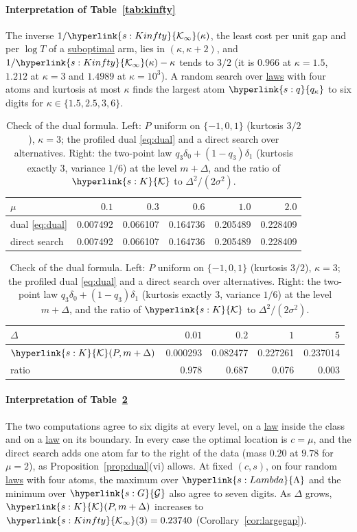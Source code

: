 \documentclass[11pt]{article}
\newcommand{\sy}[2]{{\hyperlink{#1}{#2}}}
\newcommand{\term}[2]{\hyperlink{#1}{#2}}
\newcommand{\Kc}{\sy{s:K}{\mathcal{K}}}
\newcommand{\Gk}{\sy{s:G}{\mathcal{G}}}
\newcommand{\Lam}{\sy{s:Lambda}{\Lambda}}
\newcommand{\qk}{\sy{s:q}{q_{\kappa}}}
\newcommand{\Kinfty}{\sy{s:Kinfty}{\mathcal{K}_{\infty}}}
\begin{document}
\paragraph{Interpretation of Table~\ref{tab:kinfty}} The inverse $1/\Kinfty(\kappa)$, the least cost per unit gap and per
$\log T$ of a \term{w:subopt}{suboptimal} arm, lies in $(\kappa,\kappa+2)$, and $1/\Kinfty(\kappa)-\kappa$ tends to $3/2$ (it is $0.966$ at $\kappa=1.5$, $1.212$ at
$\kappa=3$ and $1.4989$ at $\kappa=10^3$). A random search over \term{w:law}{laws} with four atoms and kurtosis at most $\kappa$ finds the
largest atom $\qk$ to six digits for $\kappa\in\{1.5,2.5,3,6\}$.

\begin{table}[t]
\centering
\small
\caption[Check of the dual formula]{Check of the dual formula. Left: $P$ uniform on $\{-1,0,1\}$ (kurtosis $3/2$), $\kappa=3$; the profiled dual
\eqref{eq:dual} and a direct search over alternatives. Right: the two-point law $q_3\delta_0+(1-q_3)\delta_1$ (kurtosis exactly
$3$, variance $1/6$) at the level $m+\Delta$, and the ratio of $\Kc$ to $\Delta^2/(2\sigma^2)$.}\label{tab:duality}
\begin{tabular}{@{}lrrrrr@{}}
\toprule
$\mu$ & $0.1$ & $0.3$ & $0.6$ & $1.0$ & $2.0$ \\
\midrule
dual \eqref{eq:dual} & 0.007492 & 0.066107 & 0.164736 & 0.205489 & 0.228409 \\
direct search & 0.007492 & 0.066107 & 0.164736 & 0.205489 & 0.228409 \\
\bottomrule
\end{tabular}
\quad
\begin{tabular}{@{}lrrrr@{}}
\toprule
$\Delta$ & $0.01$ & $0.2$ & $1$ & $5$ \\
\midrule
$\Kc(P,m+\Delta)$ & 0.000293 & 0.082477 & 0.227261 & 0.237014 \\
ratio & 0.978 & 0.687 & 0.076 & 0.003 \\
\bottomrule
\end{tabular}
\end{table}

\paragraph{Interpretation of Table~\ref{tab:duality}} The two computations agree to six digits at every level, on a \term{w:law}{law}
inside the class and on a \term{w:law}{law} on its boundary. In every case the optimal location is $c=\mu$, and the direct search
adds one atom far to the right of the data (mass $0.20$ at $9.78$ for $\mu=2$), as Proposition~\ref{prop:dual}(vi)
allows. At fixed $(c,s)$, on four random \term{w:law}{laws} with four atoms, the maximum over $\Lam$ and the minimum over $\Gk$
also agree to seven digits. As $\Delta$ grows, $\Kc(P,m+\Delta)$ increases to $\Kinfty(3)=0.23740$ (Corollary~\ref{cor:largegap}).
\end{document}
